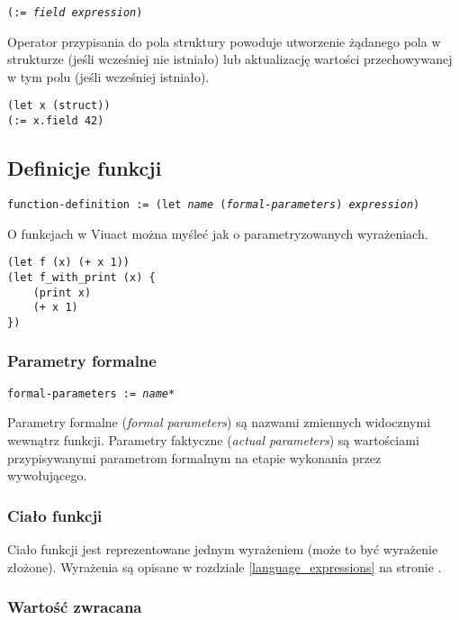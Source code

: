\texttt{(:= \emph{field} \emph{expression})}
\vspace{1em}

Operator przypisania do pola struktury powoduje utworzenie żądanego pola w strukturze (jeśli wcześniej nie
istniało) lub aktualizację wartości przechowywanej w tym polu (jeśli wcześniej istniało).

\begin{lstlisting}
(let x (struct))
(:= x.field 42)
\end{lstlisting}

\subsection{Definicje funkcji}

\texttt{function-definition := (let \emph{name} (\emph{formal-parameters}) \emph{expression})}
\vspace{1em}

O funkcjach w Viuact można myśleć jak o parametryzowanych wyrażeniach.

\begin{lstlisting}
(let f (x) (+ x 1))
(let f_with_print (x) {
    (print x)
    (+ x 1)
})
\end{lstlisting}

\subsubsection{Parametry formalne}

\texttt{formal-parameters := \emph{name}*}
\vspace{1em}

Parametry formalne (\emph{formal parameters}) są nazwami zmiennych widocznymi wewnątrz funkcji.
Parametry faktyczne (\emph{actual parameters}) są wartościami przypisywanymi parametrom formalnym na etapie
wykonania przez wywołującego.

\subsubsection{Ciało funkcji}

Ciało funkcji jest reprezentowane jednym wyrażeniem (może to być wyrażenie złożone).
Wyrażenia są opisane w rozdziale
\ref{language_expressions} na stronie \pageref{language_expressions}.

\subsubsection{Wartość zwracana}

